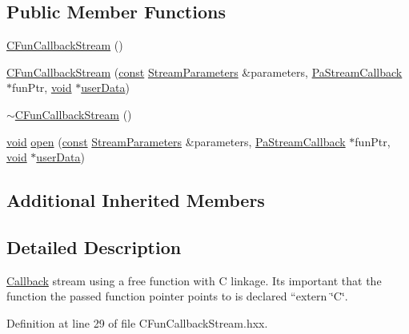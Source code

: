 \subsection*{Public Member Functions}
\begin{DoxyCompactItemize}
\item 
\hyperlink{classportaudio_1_1_c_fun_callback_stream_ab1fbe8dd296709a1953062c914fbd17b}{C\+Fun\+Callback\+Stream} ()
\item 
\hyperlink{classportaudio_1_1_c_fun_callback_stream_a95558eaf3af0dd505800e1dd29fcf269}{C\+Fun\+Callback\+Stream} (\hyperlink{getopt1_8c_a2c212835823e3c54a8ab6d95c652660e}{const} \hyperlink{classportaudio_1_1_stream_parameters}{Stream\+Parameters} \&parameters, \hyperlink{portaudio_8h_a8a60fb2a5ec9cbade3f54a9c978e2710}{Pa\+Stream\+Callback} $\ast$fun\+Ptr, \hyperlink{sound_8c_ae35f5844602719cf66324f4de2a658b3}{void} $\ast$\hyperlink{xmlparse_8c_a4b666535c828e23ccd16510a0a1a1943}{user\+Data})
\item 
\hyperlink{classportaudio_1_1_c_fun_callback_stream_afef2c76b88cedf9612405158388676d6}{$\sim$\+C\+Fun\+Callback\+Stream} ()
\item 
\hyperlink{sound_8c_ae35f5844602719cf66324f4de2a658b3}{void} \hyperlink{classportaudio_1_1_c_fun_callback_stream_a048ec37e6113808d8ef5aa56827e4c3d}{open} (\hyperlink{getopt1_8c_a2c212835823e3c54a8ab6d95c652660e}{const} \hyperlink{classportaudio_1_1_stream_parameters}{Stream\+Parameters} \&parameters, \hyperlink{portaudio_8h_a8a60fb2a5ec9cbade3f54a9c978e2710}{Pa\+Stream\+Callback} $\ast$fun\+Ptr, \hyperlink{sound_8c_ae35f5844602719cf66324f4de2a658b3}{void} $\ast$\hyperlink{xmlparse_8c_a4b666535c828e23ccd16510a0a1a1943}{user\+Data})
\end{DoxyCompactItemize}
\subsection*{Additional Inherited Members}


\subsection{Detailed Description}
\hyperlink{class_callback}{Callback} stream using a free function with C linkage. It\textquotesingle{}s important that the function the passed function pointer points to is declared ``extern \char`\"{}\+C\char`\"{}\textquotesingle{}\textquotesingle{}. 

Definition at line 29 of file C\+Fun\+Callback\+Stream.\+hxx.



